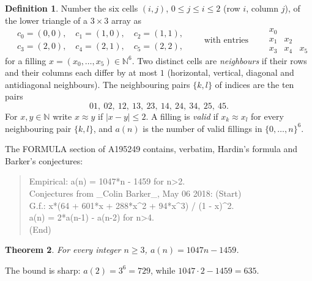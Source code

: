 \documentclass[11pt]{amsart}
\theoremstyle{plain}
\newtheorem{theorem}{Theorem}
\theoremstyle{definition}
\newtheorem{definition}[theorem]{Definition}
\newcommand{\N}{\mathbb{N}}
\newcommand{\nr}{\approx}
\begin{document}
\begin{definition}\label{def:main}
Number the six cells $(i,j)$, $0\le j\le i\le2$ (row $i$, column $j$), of the lower triangle of a $3\times3$ array as
\[
  \begin{aligned}&c_0=(0,0),\quad c_1=(1,0),\quad c_2=(1,1),\\ &c_3=(2,0),\quad c_4=(2,1),\quad c_5=(2,2),\end{aligned}
  \qquad\text{with entries}\qquad
  \begin{array}{ccc} x_0 & & \\ x_1 & x_2 & \\ x_3 & x_4 & x_5 \end{array}
\]
for a filling $x=(x_0,\dots,x_5)\in\N^6$. Two distinct cells are \emph{neighbours} if their rows and their columns each differ by at most $1$ (horizontal, vertical, diagonal and antidiagonal neighbours). The neighbouring pairs $\{k,l\}$ of indices are the ten pairs
\begin{equation}\label{eq:edges}
  01,\ 02,\ 12,\ 13,\ 23,\ 14,\ 24,\ 34,\ 25,\ 45 .
\end{equation}
For $x,y\in\N$ write $x\nr y$ if $|x-y|\le2$. A filling is \emph{valid} if $x_k\nr x_l$ for every neighbouring pair $\{k,l\}$, and $a(n)$ is the number of valid fillings in $\{0,\dots,n\}^6$.
\end{definition}

The FORMULA section of A195249 \cite{A195249} contains, verbatim, Hardin's formula and Barker's conjectures:
\begin{quote}\small\ttfamily
Empirical: a(n) = 1047*n - 1459 for n>2.\\
Conjectures from \_Colin Barker\_, May 06 2018: (Start)\\
G.f.: x*(64 + 601*x + 288*x\^{}2 + 94*x\^{}3) / (1 - x)\^{}2.\\
a(n) = 2*a(n-1) - a(n-2) for n>4.\\
(End)
\end{quote}

\begin{theorem}\label{thm:main}
For every integer $n\ge3$, $a(n)=1047n-1459$.
\end{theorem}

The bound is sharp: $a(2)=3^6=729$, while $1047\cdot2-1459=635$.
\end{document}
